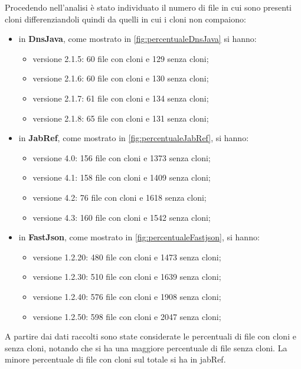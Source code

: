 Procedendo nell'analisi è stato individuato il numero di file in cui sono presenti cloni differenziandoli quindi da quelli in cui i cloni non compaiono:
\begin{itemize}
	\item in \textbf{DnsJava}, come mostrato in \autoref{fig:percentualeDnsJava} si hanno:
	\begin{itemize}
		\item versione 2.1.5: 60 file con cloni e 129 senza cloni;
		\item versione 2.1.6: 60 file con cloni e 130 senza cloni;
		\item versione 2.1.7: 61 file con cloni e 134 senza cloni;
		\item versione 2.1.8: 65 file con cloni e 131 senza cloni;
	\end{itemize}
	\item in \textbf{JabRef}, come mostrato in \autoref{fig:percentualeJabRef}, si hanno:
	\begin{itemize}
		\item versione 4.0: 156 file con cloni e 1373 senza cloni;
		\item versione 4.1: 158 file con cloni e 1409 senza cloni;
		\item versione 4.2: 76 file con cloni e 1618 senza cloni;
		\item versione 4.3: 160 file con cloni e 1542 senza cloni;
	\end{itemize}
		\item in \textbf{FastJson}, come mostrato in \autoref{fig:percentualeFastjson}, si hanno:
	\begin{itemize}
		\item versione 1.2.20: 480 file con cloni e 1473 senza cloni;
		\item versione 1.2.30: 510 file con cloni e 1639 senza cloni;
		\item versione 1.2.40: 576 file con cloni e 1908 senza cloni;
		\item versione 1.2.50: 598 file con cloni e 2047 senza cloni;
	\end{itemize}
\end{itemize}
A partire dai dati raccolti sono state considerate le percentuali di file con cloni e senza cloni, notando che si ha una maggiore percentuale di file senza cloni. La minore percentuale di file con cloni sul totale si ha in jabRef.
